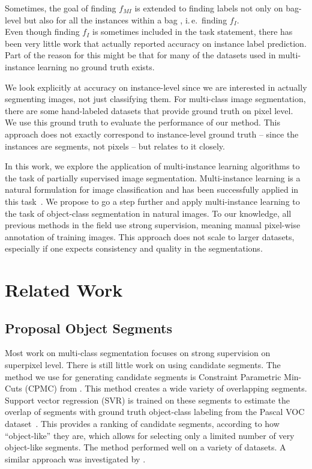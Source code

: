 \documentclass{llncs} %
\begin{document}
Sometimes, the goal of finding $f_{MI}$ is extended to finding labels not only
on bag-level but also for all the instances within a bag
\citep{liconvex2010,zha2008joint}, i.\,e.\ finding $f_{I}$.\\ 
Even though finding $f_{I}$ is sometimes included in the task statement, there
has been very little work that actually reported accuracy on instance label prediction. Part
of the reason for this might be that for many of the datasets used in
multi-instance learning no ground truth exists.

We look explicitly at accuracy on instance-level since we are interested in
actually segmenting images, not just classifying them. For multi-class image
segmentation, there are some hand-labeled datasets that provide ground truth
on pixel level. We use this ground truth to evaluate the performance of our
method. This approach does not exactly correspond to instance-level ground truth --
since the instances are segments, not pixels -- but relates to it closely.


In this work, we explore the 
application of multi-instance learning algorithms to the task of partially supervised image segmentation.
Multi-instance learning is a natural formulation for image classification and has been
successfully applied in this task~\citep{zhou2007multi}. We propose to go a step further and apply
multi-instance learning to the task of object-class segmentation in natural
images. To our knowledge, all previous
methods in the field use strong supervision, meaning manual pixel-wise annotation of
training images. This approach does not
scale to larger datasets, especially if one expects consistency and quality
in the segmentations.

\section{Related Work}
\subsection{Proposal Object Segments}\label{related_segments}
Most work on multi-class segmentation focuses on strong supervision on superpixel level. There is still little work on using candidate segments.
The method we use for generating candidate segments is Constraint Parametric Min-Cuts (CPMC) from \citet{carreira2010constrained}.
This method creates a wide variety of overlapping segments. Support vector regression (SVR) is trained on these segments
to estimate the overlap of segments with ground truth object-class labeling
from the Pascal VOC dataset~\citep{pascal}. This provides a ranking of candidate segments, according to how ``object-like'' they are, which
allows for selecting only a limited number of very object-like segments.
The method performed well on a variety of datasets.
A similar approach was investigated by \citet{endres2010category}.
\end{document}
